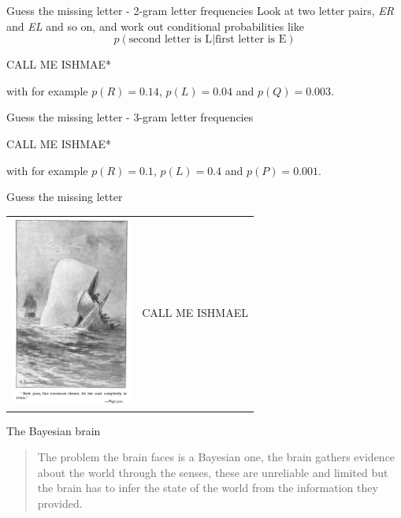 \documentclass{beamer}
\newcommand{\crish}{\color{reddish}}
\newcommand{\cbla}{\color{black}}
\newcommand{\cred}{\color{red}}
\newcommand{\cblu}{\color{blue}}
\begin{document}
\begin{frame}{Guess the missing letter - 2-gram letter frequencies}
  Look at two letter pairs, \textsl{ER} and \textsl{EL} and so on, and
  work out conditional probabilities like \crish$$ p(\mbox{second
    letter is L}|\mbox{first letter is E})
  $$\cbla{}
  \begin{center}
    \cred{}CALL ME ISHMA\cblu{}E*\cbla{}
  \end{center}
  with for example \crish$p(R)=0.14$\cbla{}, \crish$p(L)=0.04$\cbla{} and \crish$p(Q)=0.003$\cbla{}. 
  \end{frame}


\begin{frame}{Guess the missing letter - 3-gram letter frequencies}


    \begin{center}
    \cred{}CALL ME ISHM\cblu{}AE*\cbla{}
  \end{center}
  with for example \crish$p(R)=0.1$\cbla{}, \crish$p(L)=0.4$\cbla{} and \crish$p(P)=0.001$\cbla{}. 
  \end{frame}


\begin{frame}{Guess the missing letter}
  \begin{tabular}{lc}
    \includegraphics[width=4cm]{Moby_Dick.jpg}&\cred{}CALL ME ISHMAEL\cbla{}
  \end{tabular}
  \end{frame}

\begin{frame}{The Bayesian brain}

  \begin{quote}
    The problem the brain faces is a Bayesian one, the brain
gathers evidence about the world through the senses, these are
unreliable and limited but the brain has to infer the state of the
world from the information they provided.
  \end{quote}
\end{frame}
\end{document}
